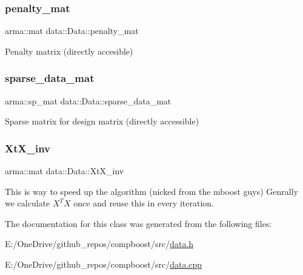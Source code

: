 \subsubsection{\texorpdfstring{penalty\+\_\+mat}{penalty\_mat}}
{\footnotesize\ttfamily arma\+::mat data\+::\+Data\+::penalty\+\_\+mat}



Penalty matrix (directly accesible) 

\mbox{\label{classdata_1_1_data_abc5c5380b4aa8120cdda74195b90955f}} 
\subsubsection{\texorpdfstring{sparse\+\_\+data\+\_\+mat}{sparse\_data\_mat}}
{\footnotesize\ttfamily arma\+::sp\+\_\+mat data\+::\+Data\+::sparse\+\_\+data\+\_\+mat}



Sparse matrix for design matrix (directly accessible) 

\mbox{\label{classdata_1_1_data_a31bdf7564f8589487a0ee9952ebef0c0}} 
\subsubsection{\texorpdfstring{Xt\+X\+\_\+inv}{XtX\_inv}}
{\footnotesize\ttfamily arma\+::mat data\+::\+Data\+::\+Xt\+X\+\_\+inv}

This is way to speed up the algorithm (nicked from the mboost guys) Genrally we calculate $X^T X$ once and reuse this in every iteration. 

The documentation for this class was generated from the following files\+:\begin{DoxyCompactItemize}
\item 
E\+:/\+One\+Drive/github\+\_\+repos/compboost/src/\mbox{\hyperlink{data_8h}{data.\+h}}\item 
E\+:/\+One\+Drive/github\+\_\+repos/compboost/src/\mbox{\hyperlink{data_8cpp}{data.\+cpp}}\end{DoxyCompactItemize}
